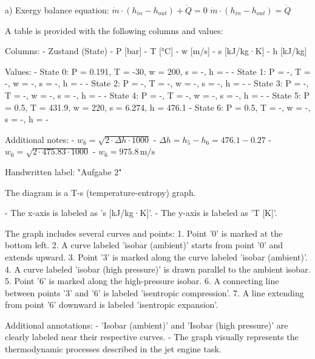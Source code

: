 a) Exergy balance equation:  
\( \dot{m} \cdot (h_{in} - h_{out}) + \dot{Q} = 0 \)  
\( \dot{m} \cdot (h_{in} - h_{out}) = \dot{Q} \)

A table is provided with the following columns and values:  

Columns:  
- Zustand (State)  
- P [bar]  
- T [°C]  
- w [m/s]  
- s [kJ/kg·K]  
- h [kJ/kg]  

Values:  
- State 0: P = 0.191, T = -30, w = 200, s = -, h = -  
- State 1: P = -, T = -, w = -, s = -, h = -  
- State 2: P = -, T = -, w = -, s = -, h = -  
- State 3: P = -, T = -, w = -, s = -, h = -  
- State 4: P = -, T = -, w = -, s = -, h = -  
- State 5: P = 0.5, T = 431.9, w = 220, s = 6.274, h = 476.1  
- State 6: P = 0.5, T = -, w = -, s = -, h = -  

Additional notes:  
- \( w_6 = \sqrt{2 \cdot \Delta h \cdot 1000} \)  
- \( \Delta h = h_5 - h_6 = 476.1 - 0.27 \)  
- \( w_6 = \sqrt{2 \cdot 475.83 \cdot 1000} \)  
- \( w_6 = 975.8 \, \text{m/s} \)  

Handwritten label: "Aufgabe 2"

The diagram is a T-s (temperature-entropy) graph.  

- The x-axis is labeled as 's [kJ/kg·K]'.  
- The y-axis is labeled as 'T [K]'.  

The graph includes several curves and points:  
1. Point '0' is marked at the bottom left.  
2. A curve labeled 'isobar (ambient)' starts from point '0' and extends upward.  
3. Point '3' is marked along the curve labeled 'isobar (ambient)'.  
4. A curve labeled 'isobar (high pressure)' is drawn parallel to the ambient isobar.  
5. Point '6' is marked along the high-pressure isobar.  
6. A connecting line between points '3' and '6' is labeled 'isentropic compression'.  
7. A line extending from point '6' downward is labeled 'isentropic expansion'.  

Additional annotations:  
- 'Isobar (ambient)' and 'Isobar (high pressure)' are clearly labeled near their respective curves.  
- The graph visually represents the thermodynamic processes described in the jet engine task.